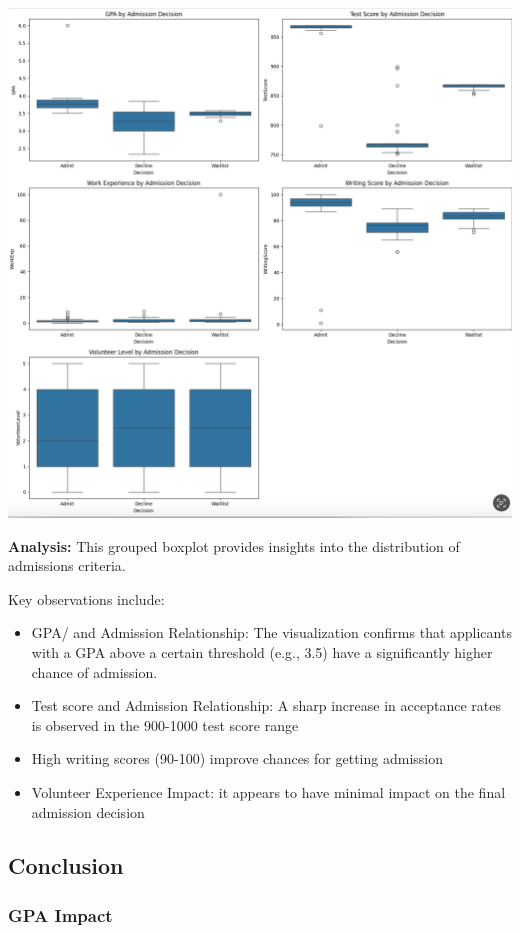\documentclass[
  letterpaper,
  DIV=11,
  numbers=noendperiod]{scrartcl}
\begin{document}
\includegraphics{images/paste-1.png}

\textbf{Analysis:} This grouped boxplot provides insights into the
distribution of admissions criteria.

Key observations include:

\begin{itemize}
\item
  GPA/ and Admission Relationship: The visualization confirms that
  applicants with a GPA above a certain threshold (e.g., 3.5) have a
  significantly higher chance of admission.
\item
  Test score and Admission Relationship: A sharp increase in acceptance
  rates is observed in the 900-1000 test score range
\item
  High writing scores (90-100) improve chances for getting admission
\item
  Volunteer Experience Impact: it appears to have minimal impact on the
  final admission decision
\end{itemize}

\subsection{Conclusion}\label{conclusion}

\subsubsection{GPA Impact}\label{gpa-impact}
\end{document}
